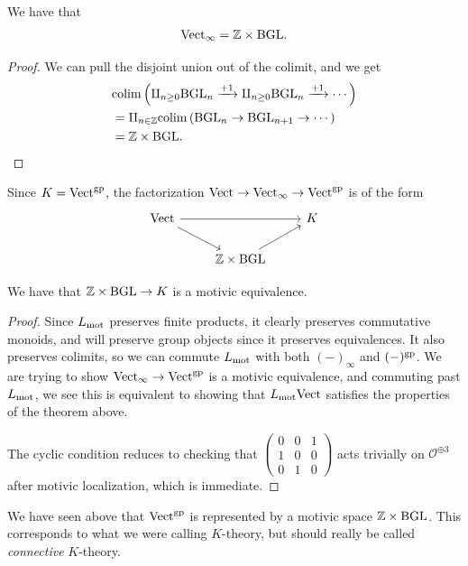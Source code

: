 \documentclass[11pt,openany]{book}
\begin{document}
\begin{proposition} We have that
\begin{align*}
    \mathrm{Vect}_\infty = \mathbb{Z} \times \mathrm{BGL}.
\end{align*}
\end{proposition}
\begin{proof} We can pull the disjoint union out of the colimit, and we get
\begin{align*}
    &\mathrm{colim} \left( \amalg_{n\ge0} \mathrm{BGL}_n\xrightarrow{\text{+1}} \amalg_{n\ge0} \mathrm{BGL}_n\xrightarrow{\text{+1}}\cdots \right) \\
    &= \amalg_{n\in \mathbb{Z}} \mathrm{colim} \left( \mathrm{BGL}_n \to \mathrm{BGL}_{n+1} \to \cdots \right) \\
    &= \mathbb{Z} \times \mathrm{BGL}.
\end{align*}
\end{proof}

Since $K = \mathrm{Vect}^{\mathrm{gp}}$, the factorization $\mathrm{Vect} \to \mathrm{Vect}_\infty \to \mathrm{Vect}^{\mathrm{gp}}$ is of the form
\[ \begin{tikzcd}
    \Vect\ar[rr]\ar[dr] &  & K\\
     & \Z \times \BGL\ar[ur] &
\end{tikzcd} \]

\begin{theorem}\label{thm:K-is-BGLxZ} 
We have that $\mathbb{Z} \times \mathrm{BGL} \to K$ is a motivic equivalence.
\end{theorem}
\begin{proof} Since $L_{\mathrm{mot}}$ preserves finite products, it clearly preserves commutative monoids, and will preserve group objects since it preserves equivalences. It also preserves colimits, so we can commute $L_{\mathrm{mot}}$ with both $(-)_\infty$ and $(-)^{\mathrm{gp}}$. We are trying to show $\mathrm{Vect}_\infty \to \mathrm{Vect}^{\mathrm{gp}}$ is a motivic equivalence, and commuting past $L_{\mathrm{mot}}$, we see this is equivalent to showing that $L_{\mathrm{mot}} \mathrm{Vect}$ satisfies the properties of the theorem above.

The cyclic condition reduces to checking that $\begin{pmatrix} 0 & 0 & 1 \\ 1 & 0 & 0 \\ 0 & 1 & 0 \end{pmatrix}$ acts trivially on $\mathcal{O}^{\oplus3}$ after motivic localization, which is immediate.
\end{proof}


We have seen above that $\mathrm{Vect}^{\mathrm{gp}}$ is represented by a motivic space $\mathbb{Z} \times \mathrm{BGL}$. This corresponds to what we were calling $K$-theory, but should really be called \textit{connective} $K$-theory.
\end{document}
